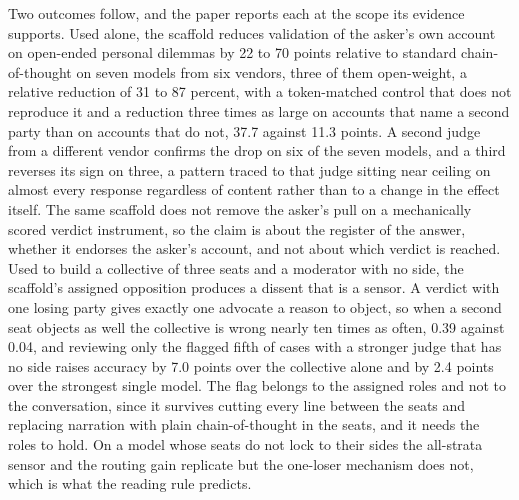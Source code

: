 Two outcomes follow, and the paper reports each at the scope its
evidence supports. Used alone, the scaffold reduces validation of the
asker's own account on open-ended personal dilemmas by 22 to 70 points
relative to standard chain-of-thought on seven models from six vendors,
three of them open-weight, a relative reduction of 31 to 87 percent,
with a token-matched control that does not reproduce it and a reduction
three times as large on accounts that name a second party than on accounts
that do not, 37.7 against 11.3 points. A second judge from a different
vendor confirms the drop on six of the seven models, and a third reverses
its sign on three, a pattern traced to that judge sitting near ceiling on
almost every response regardless of content rather than to a change in
the effect itself.
The same scaffold does not remove the asker's pull on a mechanically
scored verdict instrument,
so the claim is about the register of the answer, whether it endorses the
asker's account, and not about which verdict is reached.
Used to build a collective of three seats and a moderator with no side, the
scaffold's assigned opposition produces a dissent that is a sensor. A
verdict with one losing party gives exactly one advocate a reason to
object, so when a second seat objects as well the collective is wrong
nearly ten times as often, 0.39 against 0.04,
and reviewing only the flagged fifth of cases with a stronger judge that
has no side raises accuracy by 7.0 points over the collective alone
and by 2.4 points over the strongest single model.
The flag belongs to the assigned roles and not to the conversation, since
it survives cutting every line between the seats
and replacing narration with plain chain-of-thought in the seats,
and it needs the roles to hold. On a model whose seats do not lock to
their sides the all-strata sensor and the routing gain replicate but the
one-loser mechanism does not,
which is what the reading rule predicts.

